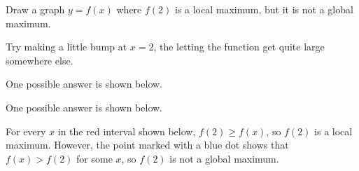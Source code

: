 \begin{question}
Draw a graph $y=f(x)$ where $f(2)$ is a local maximum, but it is not a  global maximum.
\end{question}
\begin{hint}
Try making a little bump at $x=2$, the letting the function get quite large somewhere else.
\end{hint}
\begin{answer}
One possible answer is shown below.
\begin{center}
\end{center}
\end{answer}
\begin{solution}
One possible answer is shown below.
\begin{center}
\end{center}
For every $x$ in the red interval shown below, $f(2) \geq f(x)$, so $f(2)$ is a local maximum. However, the point marked with a blue dot shows that $f(x)>f(2)$ for some $x$, so $f(2)$ is not a global maximum.
\begin{center}
\end{center}
\end{solution}

\subsection*{\Procedural}



